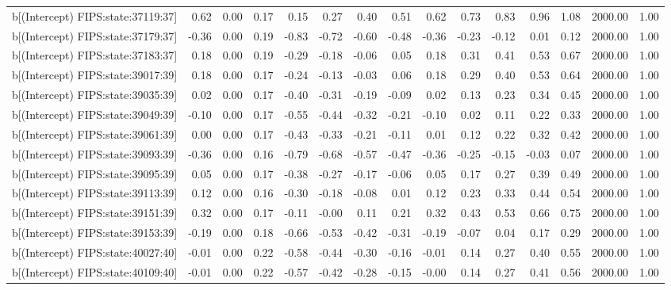 \begin{table}[ht]
\begin{tabular}{rrrrrrrrrrrrrrr}
  b[(Intercept) FIPS:state:37119:37] & 0.62 & 0.00 & 0.17 & 0.15 & 0.27 & 0.40 & 0.51 & 0.62 & 0.73 & 0.83 & 0.96 & 1.08 & 2000.00 & 1.00 \\ 
  b[(Intercept) FIPS:state:37179:37] & -0.36 & 0.00 & 0.19 & -0.83 & -0.72 & -0.60 & -0.48 & -0.36 & -0.23 & -0.12 & 0.01 & 0.12 & 2000.00 & 1.00 \\ 
  b[(Intercept) FIPS:state:37183:37] & 0.18 & 0.00 & 0.19 & -0.29 & -0.18 & -0.06 & 0.05 & 0.18 & 0.31 & 0.41 & 0.53 & 0.67 & 2000.00 & 1.00 \\ 
  b[(Intercept) FIPS:state:39017:39] & 0.18 & 0.00 & 0.17 & -0.24 & -0.13 & -0.03 & 0.06 & 0.18 & 0.29 & 0.40 & 0.53 & 0.64 & 2000.00 & 1.00 \\ 
  b[(Intercept) FIPS:state:39035:39] & 0.02 & 0.00 & 0.17 & -0.40 & -0.31 & -0.19 & -0.09 & 0.02 & 0.13 & 0.23 & 0.34 & 0.45 & 2000.00 & 1.00 \\ 
  b[(Intercept) FIPS:state:39049:39] & -0.10 & 0.00 & 0.17 & -0.55 & -0.44 & -0.32 & -0.21 & -0.10 & 0.02 & 0.11 & 0.22 & 0.33 & 2000.00 & 1.00 \\ 
  b[(Intercept) FIPS:state:39061:39] & 0.00 & 0.00 & 0.17 & -0.43 & -0.33 & -0.21 & -0.11 & 0.01 & 0.12 & 0.22 & 0.32 & 0.42 & 2000.00 & 1.00 \\ 
  b[(Intercept) FIPS:state:39093:39] & -0.36 & 0.00 & 0.16 & -0.79 & -0.68 & -0.57 & -0.47 & -0.36 & -0.25 & -0.15 & -0.03 & 0.07 & 2000.00 & 1.00 \\ 
  b[(Intercept) FIPS:state:39095:39] & 0.05 & 0.00 & 0.17 & -0.38 & -0.27 & -0.17 & -0.06 & 0.05 & 0.17 & 0.27 & 0.39 & 0.49 & 2000.00 & 1.00 \\ 
  b[(Intercept) FIPS:state:39113:39] & 0.12 & 0.00 & 0.16 & -0.30 & -0.18 & -0.08 & 0.01 & 0.12 & 0.23 & 0.33 & 0.44 & 0.54 & 2000.00 & 1.00 \\ 
  b[(Intercept) FIPS:state:39151:39] & 0.32 & 0.00 & 0.17 & -0.11 & -0.00 & 0.11 & 0.21 & 0.32 & 0.43 & 0.53 & 0.66 & 0.75 & 2000.00 & 1.00 \\ 
  b[(Intercept) FIPS:state:39153:39] & -0.19 & 0.00 & 0.18 & -0.66 & -0.53 & -0.42 & -0.31 & -0.19 & -0.07 & 0.04 & 0.17 & 0.29 & 2000.00 & 1.00 \\ 
  b[(Intercept) FIPS:state:40027:40] & -0.01 & 0.00 & 0.22 & -0.58 & -0.44 & -0.30 & -0.16 & -0.01 & 0.14 & 0.27 & 0.40 & 0.55 & 2000.00 & 1.00 \\ 
  b[(Intercept) FIPS:state:40109:40] & -0.01 & 0.00 & 0.22 & -0.57 & -0.42 & -0.28 & -0.15 & -0.00 & 0.14 & 0.27 & 0.41 & 0.56 & 2000.00 & 1.00 \\ 

\end{tabular}
\end{table}
